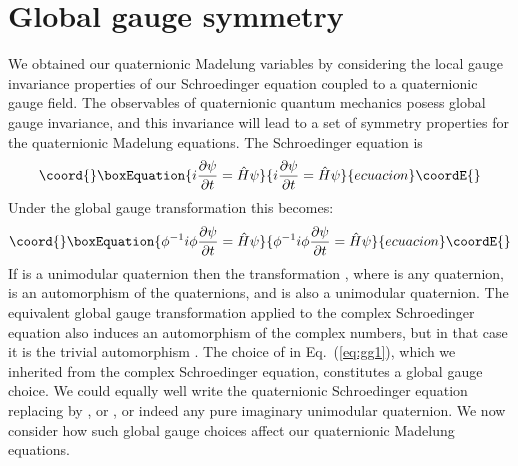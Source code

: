 \documentclass[a4paper,aps,prd,preprint,groupedaddress]{revtex4}
\begin{document}
\section{Global gauge symmetry\label{sec:app3}}
We obtained our quaternionic Madelung variables by considering the local gauge invariance properties of our Schroedinger equation coupled to a quaternionic gauge field. The observables of quaternionic quantum mechanics posess global \coordHE{} gauge invariance, and this invariance will lead to a set of symmetry properties for the quaternionic Madelung equations. The Schroedinger equation is
\begin{equation}\coord{}\boxEquation{\label{eq:gg1}
i\frac{\partial \psi}{\partial t} =\hat H\psi
}{i\frac{\partial \psi}{\partial t} =\hat H\psi
}{ecuacion}\coordE{}\end{equation}
Under the global gauge transformation \coordHE{} this becomes:
\begin{equation}\coord{}\boxEquation{\label{eq:gg2}
\phi^{-1}i\phi\frac{\partial \psi}{\partial t} =\hat H \psi
}{\phi^{-1}i\phi\frac{\partial \psi}{\partial t} =\hat H \psi
}{ecuacion}\coordE{}\end{equation}
If \myHighlight{$\phi$}\coordHE{} is a unimodular quaternion then the transformation \coordHE{}, where \coordHE{} is any quaternion, is an automorphism of the quaternions, and \coordHE{} is also a unimodular quaternion. The equivalent global gauge transformation applied to the complex Schroedinger equation also induces an automorphism of the complex numbers, but in that case it is the trivial automorphism \coordHE{}. The choice of \coordHE{} in Eq.~(\ref{eq:gg1}), which we inherited from the complex Schroedinger  equation, constitutes a global gauge choice. We could equally well write the quaternionic Schroedinger equation replacing \coordHE{} by \coordHE{}, or \coordHE{}, or indeed any pure imaginary unimodular quaternion. We now consider how such global gauge choices affect our quaternionic Madelung equations.
\end{document}

